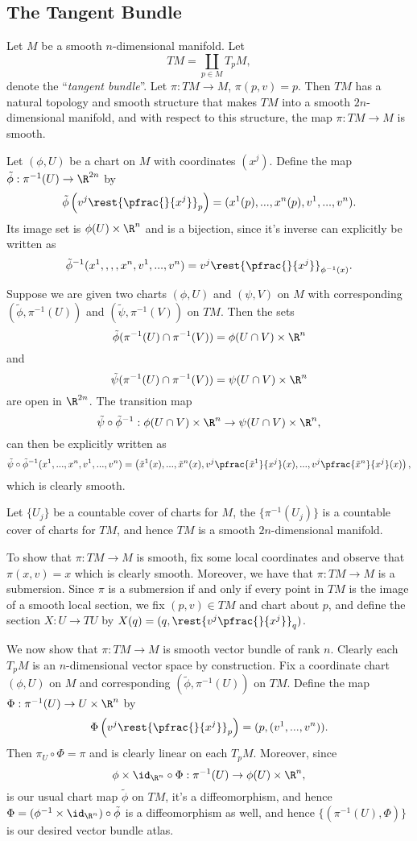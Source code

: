 



\subsection{The Tangent Bundle}


Let $M$ be a smooth $n$-dimensional manifold.  Let
$$TM=\coprod_{p\in M}T_pM,$$
denote the ``\textit{tangent bundle}''.  Let $\pi:TM\to M$, $\pi(p,v)=p$.  Then $TM$ has a natural topology and smooth structure that makes $TM$ into a smooth $2n$-dimensional manifold, and with respect to this structure, the map $\pi:TM\to M$ is smooth.

Let $(\phi,U)$ be a chart on $M$ with coordinates $(x^j)$.  Define the map $\tilde{\phi}:\pi^{-1}(U)\to\R^{2n}$ by
$$\tilde{\phi}\left(v^j\rest{\pfrac{}{x^j}}_p\right)=(x^1(p),...,x^n(p),v^1,...,v^n).$$
Its image set is $\phi(U)\times\R^n$ and is a bijection, since it's inverse can explicitly be written as
$$\tilde{\phi}^{-1}(x^1,,,,x^n,v^1,...,v^n)=v^j\rest{\pfrac{}{x^j}}_{\phi^{-1}(x)}.$$

Suppose we are given two charts $(\phi,U)$ and $(\psi,V)$ on $M$ with corresponding $(\tilde{\phi},\pi^{-1}(U))$ and $(\tilde{\psi},\pi^{-1}(V))$ on $TM$.  Then the sets
$$\tilde{\phi}(\pi^{-1}(U)\cap\pi^{-1}(V))=\phi(U\cap V)\times\R^n$$
and
$$\tilde{\psi}(\pi^{-1}(U)\cap\pi^{-1}(V))=\psi(U\cap V)\times\R^n$$
are open in $\R^{2n}$.  The transition map
$$\tilde{\psi}\circ\tilde{\phi}^{-1}:\phi(U\cap V)\times\R^n\to\psi(U\cap V)\times\R^n,$$
can then be explicitly written as
$$\tilde{\psi}\circ\tilde{\phi}^{-1}(x^1,...,x^n,v^1,...,v^n)=\left(\tilde{x}^1(x),...,\tilde{x}^n(x),v^j\pfrac{\tilde{x}^1}{x^j}(x),...,v^j\pfrac{\tilde{x}^n}{x^j}(x)\right),$$
which is clearly smooth.

Let $\{U_j\}$ be a countable cover of charts for $M$, the $\{\pi^{-1}(U_j)\}$ is a countable cover of charts for $TM$, and hence $TM$ is a smooth $2n$-dimensional manifold.

To show that $\pi:TM\to M$ is smooth, fix some local coordinates and observe that $\pi(x,v)=x$ which is clearly smooth.  Moreover, we have that $\pi:TM\to M$ is a submersion.  Since $\pi$ is a submersion if and only if every point in $TM$ is the image of a smooth local section, we fix $(p,v)\in TM$ and chart about $p$, and define the section $X:U\to TU$ by $X(q)=(q,\rest{v^j\pfrac{}{x^j}}_q)$.

We now show that $\pi:TM\to M$ is smooth vector bundle of rank $n$.  Clearly each $T_pM$ is an $n$-dimensional vector space by construction.  Fix a coordinate chart $(\phi, U)$ on $M$ and corresponding $(\tilde{\phi},\pi^{-1}(U))$ on $TM$.  Define the map $\Phi:\pi^{-1}(U)\to U\times\R^n$ by
$$\Phi\left(v^j\rest{\pfrac{}{x^j}}_p\right)=(p,(v^1,...,v^n)).$$
Then $\pi_U\circ\Phi=\pi$ and is clearly linear on each $T_pM$.  Moreover, since
$$\phi\times\id_{\R^n}\circ\Phi:\pi^{-1}(U)\to\phi(U)\times\R^n,$$
is our usual chart map $\tilde{\phi}$ on $TM$, it's a diffeomorphism, and hence $\Phi=(\phi^{-1}\times\id_{\R^n})\circ\tilde{\phi}$ is a diffeomorphism as well, and hence $\{(\pi^{-1}(U),\Phi)\}$ is our desired vector bundle atlas.


